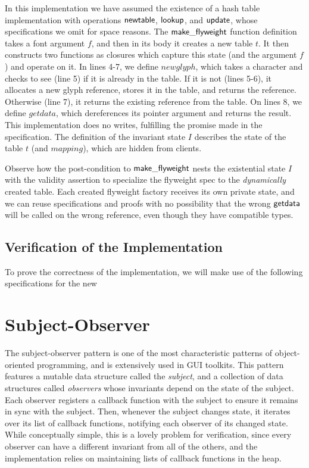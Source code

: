 In this implementation we have assumed the existence of a hash table
implementation with operations $\mathsf{newtable}$, $\mathsf{lookup}$,
and $\mathsf{update}$, whose specifications we omit for space
reasons. The $\mathsf{make\_flyweight}$ function definition takes a
font argument $f$, and then in its body it creates a new table $t$. It
then constructs two functions as closures which capture this state
(and the argument $f$) and operate on it. In lines 4-7, we define
$newglyph$, which takes a character and checks to see (line 5) if it is
already in the table. If it is not (lines 5-6), it allocates a new
glyph reference, stores it in the table, and returns the
reference. Otherwise (line 7), it returns the existing reference from
the table.  On lines 8, we define $getdata$, which dereferences
its pointer argument and returns the result. This implementation does
no writes, fulfilling the promise made in the specification. The
definition of the invariant state $I$ describes the state of the table
$t$ (and $mapping$), which are hidden from clients.

Observe how the post-condition to $\mathsf{make\_flyweight}$ nests the
existential state $I$ with the validity assertion to specialize the
flyweight spec to the \emph{dynamically} created table. Each created
flyweight factory receives its own private state, and we can reuse
specifications and proofs with no possibility that the wrong
$\mathsf{getdata}$ will be called on the wrong reference, even though
they have compatible types.

\subsection{Verification of the Implementation}

To prove the correctness of the implementation, we will make use of 
the following specifications for the new

\section{Subject-Observer}

The subject-observer pattern is one of the most characteristic
patterns of object-oriented programming, and is extensively used in
GUI toolkits. This pattern features a mutable data structure called
the \emph{subject}, and a collection of data structures called
\emph{observers} whose invariants depend on the state of the
subject. Each observer registers a callback function with the subject
to ensure it remains in sync with the subject. Then, whenever the
subject changes state, it iterates over its list of callback
functions, notifying each observer of its changed state. While
conceptually simple, this is a lovely problem for verification, since
every observer can have a different invariant from all of the others,
and the implementation relies on maintaining lists of callback
functions in the heap.  

